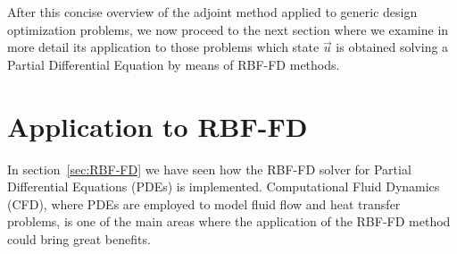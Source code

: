 After this concise overview of the adjoint method applied to generic design optimization problems, we now proceed to the next section where we examine in more detail its application to those problems which state $\vec{u}$ is obtained solving a Partial Differential Equation by means of RBF-FD methods.



\section{Application to RBF-FD}

In section~\ref{sec:RBF-FD} we have seen how the RBF-FD solver for Partial Differential Equations (PDEs) is implemented. Computational Fluid Dynamics (CFD), where PDEs are employed to model fluid flow and heat transfer problems, is one of the main areas where the application of the RBF-FD method could bring great benefits.


